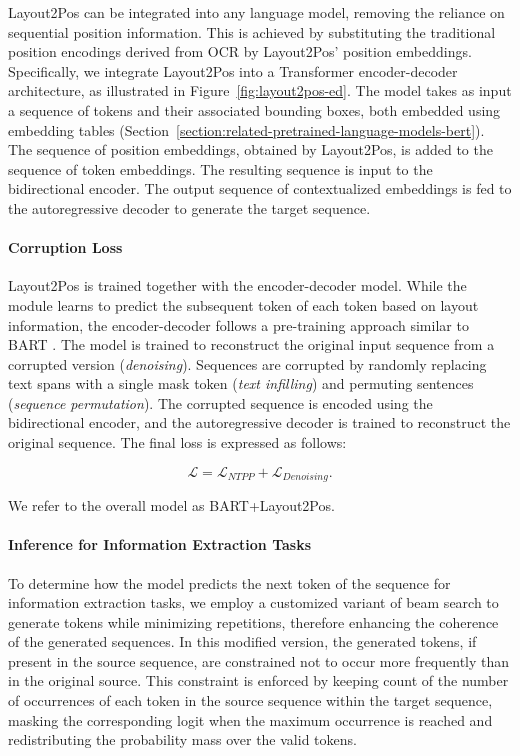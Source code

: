 Layout2Pos can be integrated into any language model, removing the reliance on sequential position information. This is achieved by substituting the traditional position encodings derived from \ac{OCR} by Layout2Pos' position embeddings. Specifically, we integrate Layout2Pos into a Transformer encoder-decoder architecture, as illustrated in Figure~\ref{fig:layout2pos-ed}. The model takes as input a sequence of tokens and their associated bounding boxes, both embedded using embedding tables (Section~\ref{section:related-pretrained-language-models-bert}). The sequence of position embeddings, obtained by Layout2Pos, is added to the sequence of token embeddings. The resulting sequence is input to the bidirectional encoder. The output sequence of contextualized embeddings is fed to the autoregressive decoder to generate the target sequence.


\paragraph{Corruption Loss} Layout2Pos is trained together with the encoder-decoder model. While the module learns to predict the subsequent token of each token based on layout information, the encoder-decoder follows a pre-training approach similar to \ac{BART} \citep{lewis2019bart}. The model is trained to reconstruct the original input sequence from a corrupted version (\textit{denoising}). Sequences are corrupted by randomly replacing text spans with a single mask token (\textit{text infilling}) and permuting sentences (\textit{sequence permutation}). The corrupted sequence is encoded using the bidirectional encoder, and the autoregressive decoder is trained to reconstruct the original sequence. The final loss is expressed as follows:

\begin{equation}
  \mathcal{L} = \mathcal{L}_{NTPP} + \mathcal{L}_{Denoising}.
\end{equation}

\noindent We refer to the overall model as BART+Layout2Pos. 


\paragraph{Inference for Information Extraction Tasks} To determine how the model predicts the next token of the sequence for information extraction tasks, we employ a customized variant of beam search to generate tokens while minimizing repetitions, therefore enhancing the coherence of the generated sequences. In this modified version, the generated tokens, if present in the source sequence, are constrained not to occur more frequently than in the original source. This constraint is enforced by keeping count of the number of occurrences of each token in the source sequence within the target sequence, masking the corresponding logit when the maximum occurrence is reached and redistributing the probability mass over the valid tokens. 


